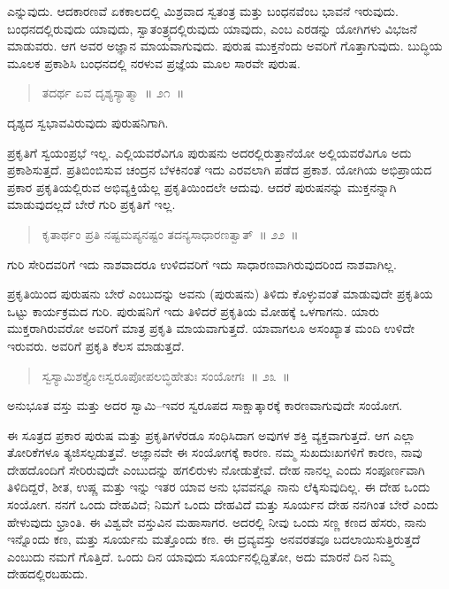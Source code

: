 ಎನ್ನುವುದು. ಆದಕಾರಣವೆ ಏಕಕಾಲದಲ್ಲಿ ಮಿಶ್ರವಾದ ಸ್ವತಂತ್ರ ಮತ್ತು ಬಂಧನವೆಂಬ ಭಾವನೆ ಇರುವುದು. ಬಂಧನದಲ್ಲಿರುವುದು ಯಾವುದು, ಸ್ವಾತಂತ್ರ್ಯದಲ್ಲಿರುವುದು ಯಾವುದು, ಎಂಬ ಎರಡನ್ನು ಯೋಗಿಗಳು ವಿಭಜನೆ ಮಾಡುವರು. ಆಗ ಅವರ ಅಜ್ಞಾನ ಮಾಯವಾಗುವುದು. ಪುರುಷ ಮುಕ್ತನೆಂದು ಅವರಿಗೆ ಗೊತ್ತಾಗುವುದು. ಬುದ್ಧಿಯ ಮೂಲಕ ಪ್ರಕಾಶಿಸಿ ಬಂಧನದಲ್ಲಿ ನರಳುವ ಪ್ರಜ್ಞೆಯ ಮೂಲ ಸಾರವೇ ಪುರುಷ. 

\vspace{-0.3cm}

\begin{verse}
ತದರ್ಥ ಏವ ದೃಶ್ಯಸ್ಯಾತ್ಮಾ~॥ ೨೧~॥
\end{verse}

\vspace{-0.3cm}

ದೃಶ್ಯದ ಸ್ವಭಾವವಿರುವುದು ಪುರುಷನಿಗಾಗಿ. 

ಪ್ರಕೃತಿಗೆ ಸ್ವಯಂಪ್ರಭೆ ಇಲ್ಲ. ಎಲ್ಲಿಯವರೆವಿಗೂ ಪುರುಷನು ಅದರಲ್ಲಿರುತ್ತಾನೆಯೋ ಅಲ್ಲಿಯವರೆವಿಗೂ ಅದು ಪ್ರಕಾಶಿಸುತ್ತದೆ. ಪ್ರತಿಬಿಂಬಿಸುವ ಚಂದ್ರನ ಬೆಳಕಿನಂತೆ ಇದು ಎರವಲಾಗಿ ಪಡೆದ ಪ್ರಕಾಶ. ಯೋಗಿಯ ಅಭಿಪ್ರಾಯದ ಪ್ರಕಾರ ಪ್ರಕೃತಿಯಲ್ಲಿರುವ ಅಭಿವ್ಯಕ್ತಿಯೆಲ್ಲ ಪ್ರಕೃತಿಯಿಂದಲೇ ಆದುವು. ಆದರೆ ಪುರುಷನನ್ನು ಮುಕ್ತನನ್ನಾಗಿ ಮಾಡುವುದಲ್ಲದೆ ಬೇರೆ ಗುರಿ ಪ್ರಕೃತಿಗೆ ಇಲ್ಲ. 

\vspace{-0.3cm}

\begin{verse}
ಕೃತಾರ್ಥಂ ಪ್ರತಿ ನಷ್ಟಮಪ್ಯನಷ್ಟಂ ತದನ್ಯಸಾಧಾರಣತ್ವಾತ್​~॥ ೨೨~॥
\end{verse}

\vspace{-0.3cm}

ಗುರಿ ಸೇರಿದವರಿಗೆ ಇದು ನಾಶವಾದರೂ ಉಳಿದವರಿಗೆ ಇದು ಸಾಧಾರಣವಾಗಿರು\break ವುದರಿಂದ ನಾಶವಾಗಿಲ್ಲ. 

ಪ್ರಕೃತಿಯಿಂದ ಪುರುಷನು ಬೇರೆ ಎಂಬುದನ್ನು ಅವನು (ಪುರುಷನು) ತಿಳಿದು ಕೊಳ್ಳುವಂತೆ ಮಾಡುವುದೇ ಪ್ರಕೃತಿಯ ಒಟ್ಟು ಕಾರ್ಯಕ್ರಮದ ಗುರಿ. ಪುರುಷನಿಗೆ ಇದು ತಿಳಿದರೆ ಪ್ರಕೃತಿಯ ಮೋಹಕ್ಕೆ ಒಳಗಾಗನು. ಯಾರು ಮುಕ್ತರಾಗಿರುವರೋ ಅವರಿಗೆ ಮಾತ್ರ ಪ್ರಕೃತಿ ಮಾಯವಾಗುತ್ತದೆ. ಯಾವಾಗಲೂ ಅಸಂಖ್ಯಾತ ಮಂದಿ ಉಳಿದೇ ಇರುವರು. ಅವರಿಗೆ ಪ್ರಕೃತಿ ಕೆಲಸ ಮಾಡುತ್ತದೆ. 

\vspace{-0.3cm}

\begin{verse}
ಸ್ವಸ್ಯಾಮಿಶಕ್ತ್ಯೋಃಸ್ವರೂಪೋಪಲಬ್ಧಿಹೇತುಃ ಸಂಯೋಗಃ~॥ ೨೩~॥
\end{verse}

\vspace{-0.3cm}

ಅನುಭೂತ ವಸ್ತು ಮತ್ತು ಅದರ ಸ್ವಾಮಿ–ಇವರ ಸ್ವರೂಪದ ಸಾಕ್ಷಾತ್ಕಾರಕ್ಕೆ ಕಾರಣವಾಗು\break ವುದೇ ಸಂಯೋಗ. 

ಈ ಸೂತ್ರದ ಪ್ರಕಾರ ಪುರುಷ ಮತ್ತು ಪ್ರಕೃತಿಗಳೆರಡೂ ಸಂಧಿಸಿದಾಗ ಅವುಗಳ ಶಕ್ತಿ ವ್ಯಕ್ತವಾಗುತ್ತದೆ. ಆಗ ಎಲ್ಲಾ ತೋರಿಕೆಗಳೂ ತ್ಯಜಿಸಲ್ಪಡುತ್ತವೆ. ಅಜ್ಞಾನವೇ ಈ ಸಂಯೋಗಕ್ಕೆ ಕಾರಣ. ನಮ್ಮ ಸುಖದುಃಖಗಳಿಗೆ ಕಾರಣ, ನಾವು ದೇಹದೊಂದಿಗೆ ಸೇರಿರುವುದೇ ಎಂಬುದನ್ನು ಹಗಲಿರುಳು ನೋಡುತ್ತೇವೆ. ದೇಹ ನಾನಲ್ಲ ಎಂದು ಸಂಪೂರ್ಣವಾಗಿ ತಿಳಿದಿದ್ದರೆ, ಶೀತ, ಉಷ್ಣ ಮತ್ತು ಇನ್ನು ಇತರ ಯಾವ ಅನು ಭವವನ್ನೂ ನಾನು ಲೆಕ್ಕಿಸುವುದಿಲ್ಲ. ಈ ದೇಹ ಒಂದು ಸಂಯೋಗ. ನನಗೆ ಒಂದು ದೇಹವಿದೆ; ನಿಮಗೆ ಒಂದು ದೇಹವಿದೆ ಮತ್ತು ಸೂರ್ಯನ ದೇಹ ನನಗಿಂತ ಬೇರೆ ಎಂದು ಹೇಳುವುದು ಭ್ರಾಂತಿ. ಈ ವಿಶ್ವವೇ ವಸ್ತುವಿನ ಮಹಾಸಾಗರ. ಅದರಲ್ಲಿ ನೀವು ಒಂದು ಸಣ್ಣ ಕಣದ ಹೆಸರು, ನಾನು ಇನ್ನೊಂದು ಕಣ, ಮತ್ತು ಸೂರ್ಯನು ಮತ್ತೊಂದು ಕಣ. ಈ ದ್ರವ್ಯವಸ್ತು ಅನವರತವೂ ಬದಲಾಯಿಸು\break ತ್ತಿರುತ್ತದೆ ಎಂಬುದು ನಮಗೆ ಗೊತ್ತಿದೆ. ಒಂದು ದಿನ ಯಾವುದು ಸೂರ್ಯನಲ್ಲಿದ್ದಿತೋ, ಅದು ಮಾರನೆ ದಿನ ನಿಮ್ಮ ದೇಹದಲ್ಲಿರಬಹುದು. 

